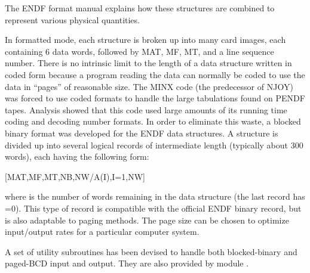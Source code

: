 The ENDF format manual\cite{ENDF102} explains how these
structures are combined to represent various physical quantities.

In formatted mode, each structure is broken up into many card images, each
containing 6 data words, followed by MAT, MF, MT, and a line sequence
number.  There is no intrinsic limit to the length of a data structure
written in coded form because a program reading the data can normally be
coded to use the data in ``pages'' of reasonable size.  The MINX
code\cite{MINX} (the predecessor of NJOY) was forced to use
coded formats to handle the large tabulations found on
PENDF tapes.  Analysis showed that this code used
large amounts of its running time coding and decoding number formats.
In order to eliminate this waste, a blocked binary
format was developed for the ENDF data structures. A structure is
divided up into several logical records of intermediate length (typically
about 300 words), each having the following form:

\small
\begin{ccode}

   [MAT,MF,MT,NB,NW/A(I),I=1,NW]

\end{ccode}
\normalsize

\noindent
where  is the number of words remaining in the data
structure (the last record has =0).  This type of record
is compatible with the official ENDF binary record, but is also
adaptable to paging methods.  The page size can be chosen to optimize
input/output rates for a particular computer system.

A set of utility subroutines has been devised to handle both
blocked-binary and paged-BCD input and output.  They are also
provided by module .

